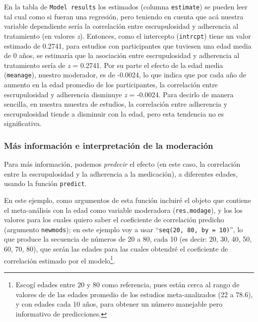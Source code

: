 \documentclass[
  bookmarksnumbered]{article}
\begin{document}
En la tabla de \texttt{Model\ results} los estimados (columna \texttt{estimate}) se pueden leer tal cual como si fueran una regresión, pero teniendo en cuenta que acá nuestra variable dependiente sería la correlación entre escrupulosidad y adherencia al tratamiento (en valores \emph{z}). Entonces, como el intercepto (\texttt{intrcpt}) tiene un valor estimado de 0.2741, para estudios con participantes que tuviesen una edad media de 0 años, se estimaría que la asociación entre escrupulosidad y adherencia al tratamiento sería de \emph{z} = 0.2741. Por su parte el efecto de la edad media (\texttt{meanage}), nuestro moderador, es de -0.0024, lo que indica que por cada año de aumento en la edad promedio de los participantes, la correlación entre escrupulosidad y adherencia disminuye \emph{z} = -0.0024. Para decirlo de manera sencilla, en nuestra muestra de estudios, la correlación entre adherencia y escrupulosidad tiende a disminuir con la edad, pero esta tendencia no es significativa.

\hypertarget{pred-mods}{%
\subsubsection{Más información e interpretación de la moderación}\label{pred-mods}}

Para más información, podemos \emph{predecir} el efecto (en este caso, la correlación entre la escrupulosidad y la adherencia a la medicación), a diferentes edades, usando la función \texttt{predict}.

En este ejemplo, como argumentos de esta función incluiré el objeto que contiene el meta-análisis con la edad como variable moderadora (\texttt{res.modage}), y los los valores para los cuales quiero saber el coeficiente de correlación predicho (argumento \texttt{newmods}); en este ejemplo voy a usar ``\texttt{seq(20,\ 80,\ by\ =\ 10)}'', lo que produce la secuencia de números de 20 a 80, cada 10 (es decir: 20, 30, 40, 50, 60, 70, 80), que serán las edades para las cuales obtendré el coeficiente de correlación estimado por el modelo\footnote{Escogí edades entre 20 y 80 como referencia, pues están cerca al rango de valores de de las edades promedio de los estudios meta-analizados (22 a 78.6), y con edades cada 10 años, para obtener un número manejable pero informativo de predicciones.}.
\end{document}
